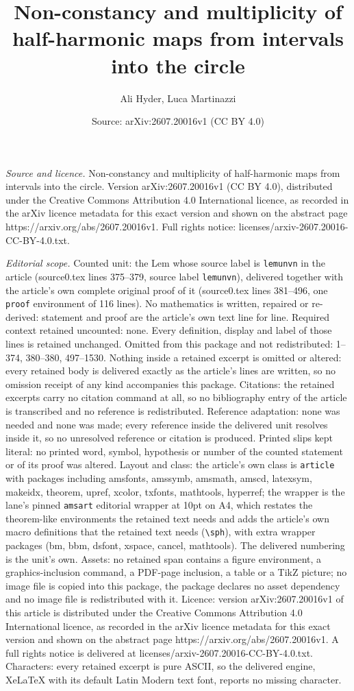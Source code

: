 \documentclass[10pt,a4paper]{amsart}
\title[Non-constancy and multiplicity of half-harmonic maps from in]{Non-constancy and multiplicity of half-harmonic maps from intervals into the circle}
\author{Ali Hyder, Luca Martinazzi}
\date{Source: arXiv:2607.20016v1 (CC BY 4.0)}
\begin{document}
\maketitle

\noindent\emph{Source and licence.} Non-constancy and multiplicity of half-harmonic maps from intervals into the circle. Version arXiv:2607.20016v1 (CC BY 4.0), distributed under the Creative Commons Attribution 4.0 International licence, as recorded in the arXiv licence metadata for this exact version and shown on the abstract page https://arxiv.org/abs/2607.20016v1. Full rights notice: licenses/arxiv-2607.20016-CC-BY-4.0.txt.\par\smallskip

\noindent\textit{Editorial scope.} Counted unit: the Lem whose source label is \texttt{lemunvn} in the article (source0.tex lines 375--379, source label \texttt{lemunvn}), delivered together with the article's own complete original proof of it (source0.tex lines 381--496, one \texttt{proof} environment of 116 lines). No mathematics is written, repaired or re-derived: statement and proof are the article's own text line for line. Required context retained uncounted: none. Every definition, display and label of those lines is retained unchanged. Omitted from this package and not redistributed: 1--374, 380--380, 497--1530. Nothing inside a retained excerpt is omitted or altered: every retained body is delivered exactly as the article's lines are written, so no omission receipt of any kind accompanies this package. Citations: the retained excerpts carry no citation command at all, so no bibliography entry of the article is transcribed and no reference is redistributed. Reference adaptation: none was needed and none was made; every reference inside the delivered unit resolves inside it, so no unresolved reference or citation is produced. Printed slips kept literal: no printed word, symbol, hypothesis or number of the counted statement or of its proof was altered. Layout and class: the article's own class is \texttt{article} with packages including amsfonts, amssymb, amsmath, amscd, latexsym, makeidx, theorem, upref, xcolor, txfonts, mathtools, hyperref; the wrapper is the lane's pinned \texttt{amsart} editorial wrapper at 10pt on A4, which restates the theorem-like environments the retained text needs and adds the article's own macro definitions that the retained text needs (\texttt{\textbackslash sph}), with extra wrapper packages (bm, bbm, dsfont, xspace, cancel, mathtools). The delivered numbering is the unit's own. Assets: no retained span contains a figure environment, a graphics-inclusion command, a PDF-page inclusion, a table or a TikZ picture; no image file is copied into this package, the package declares no asset dependency and no image file is redistributed with it. Licence: version arXiv:2607.20016v1 of this article is distributed under the Creative Commons Attribution 4.0 International licence, as recorded in the arXiv licence metadata for this exact version and shown on the abstract page https://arxiv.org/abs/2607.20016v1. A full rights notice is delivered at licenses/arxiv-2607.20016-CC-BY-4.0.txt. Characters: every retained excerpt is pure ASCII, so the delivered engine, XeLaTeX with its default Latin Modern text font, reports no missing character.
\end{document}
